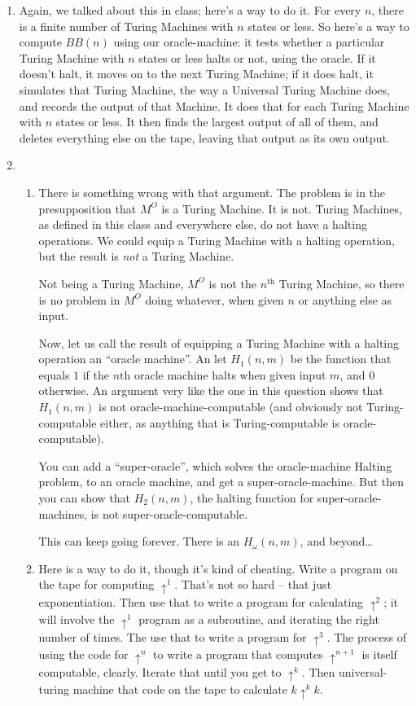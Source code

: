 \documentclass[12pt,a4paper]{article}
\begin{document}
\begin{enumerate}
\begin{enumerate}
\end{enumerate}

\item Again, we talked about this in class; here's a way to do it. For every $n$, there is a finite number of Turing Machines with $n$ states or less. So here's a way to compute $BB(n)$ using our oracle-machine: it tests whether a particular Turing Machine with $n$ states or less halts or not, using the oracle. If it doesn't halt, it moves on to the next Turing Machine; if it does halt, it simulates that Turing Machine, the way a Universal Turing Machine does, and records the output of that Machine. It does that for each Turing Machine with $n$ states or less. It then finds the largest output of all of them, and deletes everything else on the tape, leaving that output as its own output.

\item 
\begin{enumerate}

\item There is something wrong with that argument. The problem is in the presupposition that $M^O$ is a Turing Machine. It is not. Turing Machines, as defined in this class and everywhere else, do not have a halting operations. We could equip a Turing Machine with a halting operation, but the result is \emph{not} a Turing Machine.

Not being a Turing Machine, $M^O$ is not the $n^\text{th}$ Turing Machine, so there is no problem in $M^O$ doing whatever, when given $n$ or anything else as input.

Now, let us call the result of equipping a Turing Machine with a halting operation an ``oracle machine''. An let $H_1(n,m)$ be the function that equals $1$ if the $n\text{th}$ oracle machine halts when given input $m$, and $0$ otherwise. An argument very like the one in this question shows that $H_1(n,m)$ is not oracle-machine-computable (and obviously not Turing-computable either, as anything that is Turing-computable is oracle-computable).

You can add a ``super-oracle'', which solves the oracle-machine Halting problem, to an oracle machine, and get a super-oracle-machine. But then you can show that $H_2(n,m)$, the halting function for super-oracle-machines, is not super-oracle-computable.

This can keep going forever. There is an $H_\omega(n,m)$, and beyond\ldots

\item Here is a way to do it, though it's kind of cheating. Write a program on the tape for computing $\uparrow^1$. That's not so hard -- that just exponentiation. Then use that to write a program for calculating $\uparrow^2$; it will involve the $\uparrow^1$ program as a subroutine, and iterating the right number of times. The use that to write a program for $\uparrow^3$. The process of using the code for $\uparrow^n$ to write a program that computes $\uparrow^{n+1}$ is itself computable, clearly. Iterate that until you get to $\uparrow^k$. Then universal-turing machine that code on the tape to calculate $k\uparrow^k k$.


\end{enumerate}
\end{enumerate}
\end{document}
